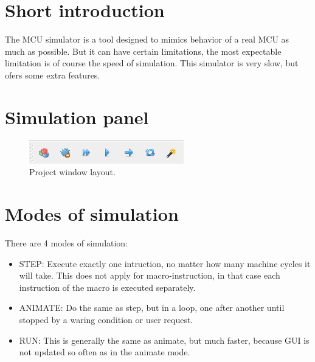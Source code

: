 \section{Short introduction}
    The MCU simulator is a tool designed to mimics behavior of a real MCU as much as possible. But it can have certain limitations, the most expectable limitation is of course the speed of simulation. This simulator is very slow, but ofers some extra features.


\section{Simulation panel}

    \begin{figure}[h!]
        \centering{}
        \includegraphics[width=.9\textwidth]{img/simulation_panel.png}
        \caption{Project window layout.}
    \end{figure}

\section{Modes of simulation}
    There are 4 modes of simulation:
    \begin{itemize}
        \item STEP: Execute exactly one intruction, no matter how many machine cycles it will take. This does not apply for macro-instruction, in that case each instruction of the macro is executed separately.
        \item ANIMATE: Do the same as step, but in a loop, one after another until stopped by a waring condition or user request.
        \item RUN: This is generally the same as animate, but much faster, because GUI is not updated so often as in the animate mode.
    \end{itemize}

